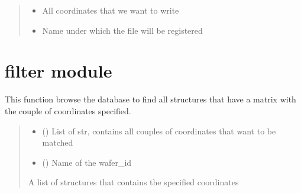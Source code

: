 \documentclass[letterpaper,10pt,english]{sphinxmanual}
\begin{document}
\begin{fulllineitems}
\begin{quote}
\begin{description}
\begin{itemize}
\item {} 
\sphinxAtStartPar
{} \textendash{} All coordinates that we want to write

\item {} 
\sphinxAtStartPar
{} \textendash{} Name under which the file will be registered

\end{itemize}

\end{description}\end{quote}

\end{fulllineitems}


\sphinxstepscope


\chapter{filter module}
\label{\detokenize{filter:module-filter}}\label{\detokenize{filter:filter-module}}\label{\detokenize{filter::doc}}

\begin{fulllineitems}
\label{\detokenize{filter:filter.filter_by_coord}}
\pysigstartsignatures
{}
\pysigstopsignatures
\sphinxAtStartPar
This function browse the database to find all structures that have a matrix with the couple of coordinates specified.
\begin{quote}\begin{description}
\begin{itemize}
\item {} 
\sphinxAtStartPar
{} () \textendash{} List of str, contains all couples of coordinates that want to be matched

\item {} 
\sphinxAtStartPar
{} () \textendash{} Name of the wafer\_id

\end{itemize}

\sphinxAtStartPar
A list of structures that contains the specified coordinates

\end{description}\end{quote}

\end{fulllineitems}
\end{document}
